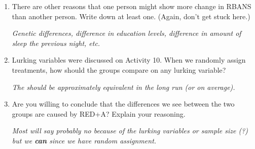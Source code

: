\begin{enumerate}
\begin{enumerate}
 \item  Below the plot, keep    and  enter the
   {\bf observed difference in means from the original data} in the
   last box.  Click . What proportion of the samples are this
   extreme?   
\begin{students}
    \vspace{2cm}    
\end{students}

\begin{key}
  {\it 0.008 in my sample. }
\end{key}

   \end{enumerate}

 \item  There are other reasons that one person might show more change
   in RBANS than another person.  Write down at least one. (Again,
   don't get stuck here.) 
\begin{students}
    \vspace{2cm}    
\end{students}

\begin{key}
  {\it   Genetic differences, difference in education levels, difference
     in amount of sleep the previous night, etc. 
}
\end{key}
\vspace{6cm}

 \item  Lurking variables were discussed on Activity 10.  When we
   randomly assign treatments, how should the groups compare on any
   lurking variable? 
\begin{students}
    \vspace{3cm}    
\end{students}

\begin{key}
  {\it  The should be approximately equivalent in the long run (or on average). }
\end{key}
   
 \item  Are you willing to conclude that the differences we see
   between the two groups are caused by RED+A?  Explain
   your reasoning. 
\begin{students}
    \vspace{4cm}    
\end{students}

\begin{key}
  {\it  
   Most will say probably no because of the lurking variables or
   sample size (?) but we {\bf can} since we have random assignment.
 }
\end{key}


\end{enumerate}
